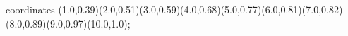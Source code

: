 					coordinates { (1.0,0.39)(2.0,0.51)(3.0,0.59)(4.0,0.68)(5.0,0.77)(6.0,0.81)(7.0,0.82)(8.0,0.89)(9.0,0.97)(10.0,1.0)};